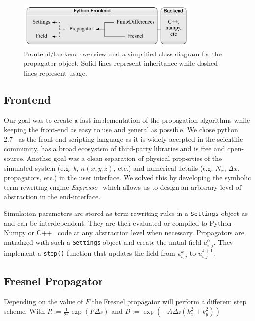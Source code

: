 
\begin{figure}[!ht]
  \centering
  \includegraphics[width=0.8\textwidth]{implementation/frontend.pdf}
  \caption{Frontend/backend overview and a simplified class diagram for the propagator object. Solid lines represent inheritance while dashed lines represent usage.}
  \label{fig:program_structure}
\end{figure}


\subsection{Frontend}

Our goal was to create a fast implementation of the propagation algorithms while keeping the front-end as easy to use and general as possible. We chose python 2.7~\cite{python} as the front-end scripting language as it is widely accepted in the scientific community, has a broad ecosystem of third-party libraries and is free and open-source. Another goal was a clean separation of physical properties of the simulated system (e.g. $k$, $n(x,y,z)$, etc.) and numerical details (e.g. $N_x$, $\Delta x$, propagators, etc.) in the user interface. We solved this by developing the symbolic term-rewriting engine \emph{Expresso}~\cite{lars_melchior_2016_46539} which allows us to design an arbitrary level of abstraction in the end-interface.

Simulation parameters are stored as term-rewriting rules in a \lstinline{Settings} object as and can be interdependent. They are then evaluated or compiled to Python-Numpy or C++~\cite{standard_c++} code at any abstraction level when necessary. Propagators are initialized with such a \lstinline{Settings} object and create the initial field $u_{i,j}^0$. They implement a \lstinline{step()} function that updates the field from $u_{i,j}^k$ to $u_{i,j}^{k+1}$.

\subsection{Fresnel Propagator \label{sec:fresnel_propagator_implementation}}

Depending on the value of $F$ the Fresnel propagator will perform a different step scheme. With $R := \frac{1}{2 \pi} \exp \! \left( F \Delta z \right)$ and $D := \exp( - A \Delta z (k_x^2+k_y^2) )$

